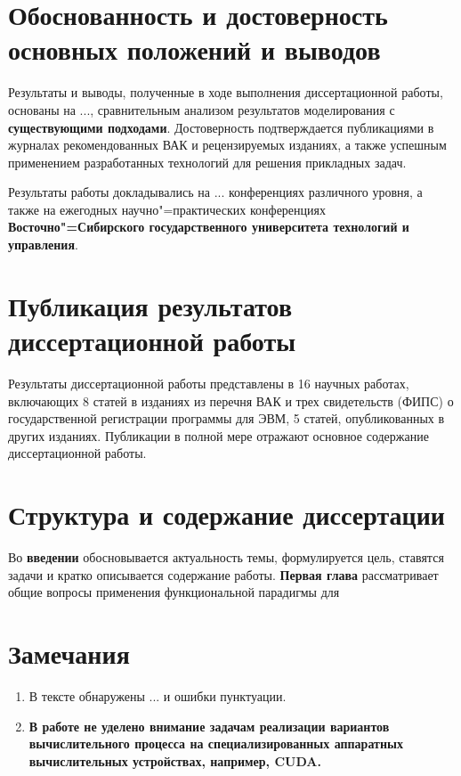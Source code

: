 \documentclass[14pt]{extarticle}
\begin{document}
\section{Обоснованность и достоверность основных положений и выводов}
\label{sec:verification}

Результаты и выводы, полученные в ходе выполнения диссертационной работы, основаны на ..., сравнительным анализом результатов моделирования с \textbf{существующими подходами}.  Достоверность подтверждается публикациями в журналах рекомендованных ВАК и рецензируемых изданиях, а также успешным применением разработанных технологий для решения прикладных задач.

Результаты работы докладывались на ... конференциях различного уровня, а также на ежегодных научно"=практических конференциях \textbf{Восточно"=Сибирского государственного университета технологий и управления}.

\section{Публикация результатов диссертационной работы}
\label{sec:publ}

Результаты диссертационной работы представлены в 16 научных работах, включающих 8 статей в изданиях из перечня ВАК и трех свидетельств (ФИПС) о государственной регистрации программы для ЭВМ, 5 статей, опубликованных в других изданиях.  Публикации в полной мере отражают основное содержание диссертационной работы.

\section{Структура и содержание диссертации}

Во \textbf{введении} обосновывается актуальность темы, формулируется цель, ставятся задачи и кратко описывается содержание работы. \textbf{Первая глава} рассматривает общие вопросы применения функциональной парадигмы для



\section{Замечания}
\begin{enumerate}
\item В тексте обнаружены ... и ошибки пунктуации.
\item \textbf{В работе не уделено внимание задачам реализации вариантов вычислительного процесса на специализированных аппаратных вычислительных устройствах, например, CUDA.}
\end{enumerate}
\end{document}
